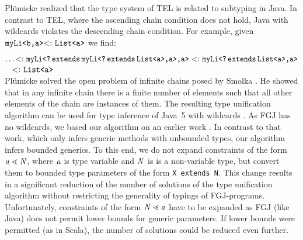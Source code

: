 Pl\"umicke \cite{plue09_1} realized that the type system of
\textsf{TEL} is related to subtyping in Java.
In contrast to \textsf{TEL}, where the ascending chain condition does
not hold,  Java with wildcards violates the descending chain
condition. For example, given $\texttt{myLi}\textrm{{\tt <b,a}}\textrm{{\tt >}} \textrm{$<:$}\ 
\texttt{List}\textrm{{\tt <a}}\textrm{{\tt >}}$ we find:

\smallskip
\noindent
$\ldots \textrm{$<:$}\ 
\texttt{myLi}\textrm{{\tt <\texttt{?\,extends\,myLi}\textrm{{\tt <\texttt{\textrm{{\tt ?}}\,extends\,List}\textrm{{\tt <a}}\textrm{{\tt >}},a}}\textrm{{\tt >}},a}}\textrm{{\tt >}}
\ \textrm{$<:$}\  \texttt{myLi}\textrm{{\tt <\texttt{?\,extends\,List}\textrm{{\tt <a}}\textrm{{\tt >}},a}}\textrm{{\tt >}}$\\
\mbox{ } \hfill $\textrm{$<:$}\ 
\texttt{List}\textrm{{\tt <a}}\textrm{{\tt >}}$\\

Pl\"umicke \cite{plue09_1} solved the open problem of infinite chains
posed by Smolka \cite{GS89}.
He showed that in any infinite chain there is a finite number of elements such that
all other elements of the chain are instances of them. The resulting type
unification algorithm can be used for type inference of Java~5 with
wildcards \cite{Plue07_3}. As FGJ has no wildcards, we based our
algorithm on an earlier work \cite{Plue04_1}.
In contrast to that work, which only infers generic methods with
unbounded types, our algorithm  infers bounded generics.
To this end, we do not expand constraints
of the form $\mathit{ a } \lessdot \mathit{N}$, where $\mathit{ a }$ is type variable and $\mathit{N}$ is is a
non-variable type, but convert them to bounded type parameters of the form
\texttt{X extends N}. This change results in a significant reduction
of the number of solutions of the type
unification algorithm without restricting the generality of typings of
FGJ-programs. Unfortunately, constraints of the form $\mathit{N} \lessdot \mathit{ a }$ have
to be expanded as FGJ (like Java) does not permit lower bounds for
generic parameters. If lower bounds were permitted  (as in Scala), the
number of solutions could be reduced even further.


